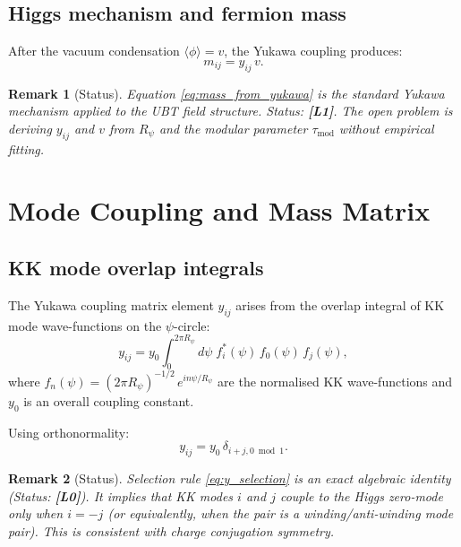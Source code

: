 \documentclass[11pt,a4paper]{article}
\newtheorem{remark}{Remark}
\begin{document}
\subsection{Higgs mechanism and fermion mass}

After the vacuum condensation $\langle\phi\rangle = v$, the Yukawa coupling
produces:
\begin{equation}
\label{eq:mass_from_yukawa}
  m_{ij} = y_{ij}\,v.
\end{equation}

\begin{remark}[Status]
  Equation \eqref{eq:mass_from_yukawa} is the standard Yukawa mechanism
  applied to the UBT field structure.  Status: \textbf{[L1]}.
  The open problem is deriving $y_{ij}$ and $v$ from $R_\psi$ and the
  modular parameter $\tau_{\mathrm{mod}}$ without empirical fitting.
\end{remark}

\section{Mode Coupling and Mass Matrix}
\label{sec:coupling}

\subsection{KK mode overlap integrals}

The Yukawa coupling matrix element $y_{ij}$ arises from the overlap integral
of KK mode wave-functions on the $\psi$-circle:
\begin{equation}
\label{eq:overlap}
  y_{ij}
  = y_0 \int_0^{2\pi R_\psi} \!\! d\psi\;
    f_i^*(\psi)\, f_0(\psi)\, f_j(\psi),
\end{equation}
where $f_n(\psi) = (2\pi R_\psi)^{-1/2}\, e^{in\psi/R_\psi}$ are the
normalised KK wave-functions and $y_0$ is an overall coupling constant.

Using orthonormality:
\begin{equation}
\label{eq:y_selection}
  y_{ij} = y_0\, \delta_{i+j, 0 \bmod 1}.
\end{equation}

\begin{remark}[Status]
  Selection rule \eqref{eq:y_selection} is an exact algebraic identity
  (Status: \textbf{[L0]}).  It implies that KK modes $i$ and $j$ couple
  to the Higgs zero-mode only when $i = -j$ (or equivalently, when the
  pair is a winding/anti-winding mode pair).  This is consistent with
  charge conjugation symmetry.
\end{remark}
\end{document}
